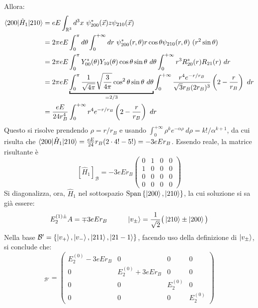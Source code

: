 \documentclass[11pt, a4paper]{scrartcl} %
\numberwithin{equation}{subsection}
\theoremstyle{style2}
\theoremstyle{style1}
\begin{document}
Allora:
\[
\begin{split}
	\braket{200|\hat{H}_1|210} &= eE \int_{\mathbb{R}^3} d^3x \ \psi ^*_{200} (\vec{x}) z\psi _{210} (\vec{x})\\
				   &=  2\pi eE \int_{0} ^{\pi} d\theta \int_{0} ^{+\infty} dr \ \psi ^*_{200} (r,\theta ) r \cos \theta \psi _{210} (r,\theta ) \ (r^2  \sin \theta )\\
				   &=2\pi eE \int_{0} ^\pi Y_{00}^* (\theta )Y_{10}(\theta ) \cos \theta \sin \theta \ d \theta \int_{0} ^{+\infty}r^3  R^*_{20} (r) R_{21} (r) \ dr\\
				   &= 2\pi e E \underbracket{\int_{0} ^\pi \frac{1}{\sqrt{4\pi} } \sqrt{\frac{3}{4\pi}} \cos^2 \theta  \sin \theta \ d\theta}_{= 2 / 3}    \int_{0} ^{+\infty} \frac{r^4 e^{-r / r_B}}{\sqrt{3} r_B(2r_B)^{3} }  \left(2 - \frac{r}{r_B}\right) \ dr \\
				   &=\frac{eE}{24r_B^4} \int_{0} ^{+\infty} r^4 e^{- r / r_B} \left(2- \frac{r}{r_B}\right) \ dr
\end{split}
\] 
Questo si risolve prendendo $\rho =  r / r_B$ e usando $\int_{0} ^{+\infty} \rho ^k e^{-\alpha \rho } \ d\rho = k! / \alpha ^{k+1} $, da cui risulta che $\braket{200|\hat{H}_1|210} =\frac{eE}{24}r_B (2\cdot 4! - 5!) = - 3eEr_B$.
Essendo reale, la matrice risultante \`e
\[
	[\hat{H}_1]_\mathcal{B} = -3e Er_B\begin{pmatrix} 0&1&0&0\\1&0&0&0\\0&0&0&0\\0&0&0&0 \end{pmatrix} 
\] 
Si diagonalizza, ora, $\hat{H}_1$ nel sottospazio $\operatorname{Span} \left\{ \ket{200} ,\ket{210}  \right\} $, la cui soluzione si sa gi\`a essere:
\[
E_2^{(1)\pm} A = \mp 3 e  E r_B \hspace{1cm} \ket{v_{\pm} } = \frac{1}{\sqrt{2} } \big(\ket{210} \pm\ket{200} \big)
\] 
Nella base $\mathcal{B} ' = \left\{ \ket{v_+} , \ket{v_-} , \ket{211} , \ket{21 - 1}  \right\} $, facendo uso della definizione di $\ket{v_{\pm} } $, si conclude che:
\begin{equation}
	[\hat{H}]_{\mathcal{B} '} = \begin{pmatrix} E_2^{(0)} - 3e Er_B & 0& 0&0\\0& E_2^{(0)} +3 e E r_B & 0& 0\\ 0 &0&E_2^{(0)} &0\\ 0&0&0&E_2^{(0)}  \end{pmatrix} 
\end{equation}
\end{document}
